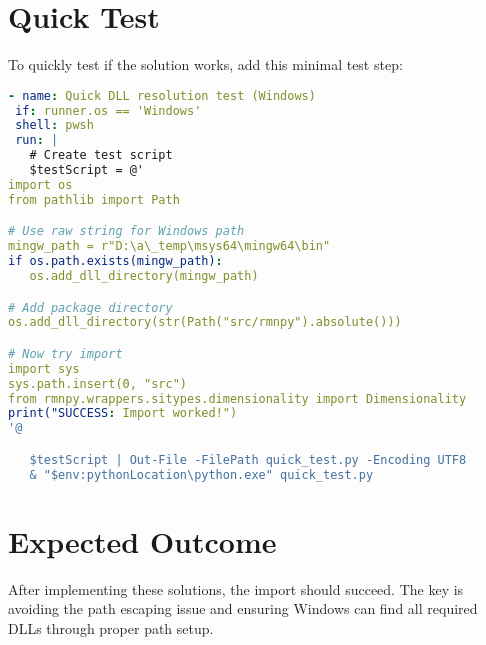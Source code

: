 \documentclass[11pt]{article}
\begin{document}
\section{Quick Test}

To quickly test if the solution works, add this minimal test step:

\begin{lstlisting}[language=yaml]
- name: Quick DLL resolution test (Windows)
 if: runner.os == 'Windows'
 shell: pwsh
 run: |
   # Create test script
   $testScript = @'
import os
from pathlib import Path

# Use raw string for Windows path
mingw_path = r"D:\a\_temp\msys64\mingw64\bin"
if os.path.exists(mingw_path):
   os.add_dll_directory(mingw_path)

# Add package directory
os.add_dll_directory(str(Path("src/rmnpy").absolute()))

# Now try import
import sys
sys.path.insert(0, "src")
from rmnpy.wrappers.sitypes.dimensionality import Dimensionality
print("SUCCESS: Import worked!")
'@

   $testScript | Out-File -FilePath quick_test.py -Encoding UTF8
   & "$env:pythonLocation\python.exe" quick_test.py
\end{lstlisting}

\section{Expected Outcome}

After implementing these solutions, the import should succeed. The key is avoiding the path escaping issue and ensuring Windows can find all required DLLs through proper path setup.
\end{document}
